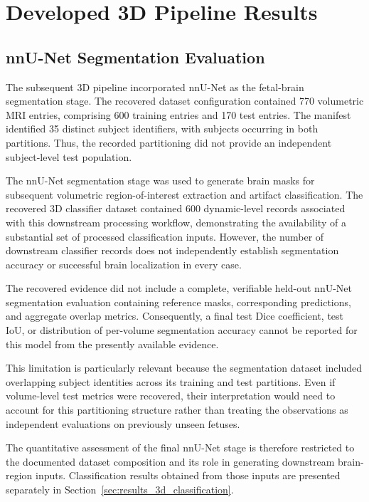 \section{Developed 3D Pipeline Results}
\subsection{nnU-Net Segmentation Evaluation}
\label{subsec:nnunet_segmentation_evaluation}

The subsequent 3D pipeline incorporated nnU-Net as the fetal-brain segmentation stage. The recovered dataset configuration contained 770 volumetric MRI entries, comprising 600 training entries and 170 test entries. The manifest identified 35 distinct subject identifiers, with subjects occurring in both partitions. Thus, the recorded partitioning did not provide an independent subject-level test population.

The nnU-Net segmentation stage was used to generate brain masks for subsequent volumetric region-of-interest extraction and artifact classification. The recovered 3D classifier dataset contained 600 dynamic-level records associated with this downstream processing workflow, demonstrating the availability of a substantial set of processed classification inputs. However, the number of downstream classifier records does not independently establish segmentation accuracy or successful brain localization in every case.

The recovered evidence did not include a complete, verifiable held-out nnU-Net segmentation evaluation containing reference masks, corresponding predictions, and aggregate overlap metrics. Consequently, a final test Dice coefficient, test IoU, or distribution of per-volume segmentation accuracy cannot be reported for this model from the presently available evidence.

This limitation is particularly relevant because the segmentation dataset included overlapping subject identities across its training and test partitions. Even if volume-level test metrics were recovered, their interpretation would need to account for this partitioning structure rather than treating the observations as independent evaluations on previously unseen fetuses.

The quantitative assessment of the final nnU-Net stage is therefore restricted to the documented dataset composition and its role in generating downstream brain-region inputs. Classification results obtained from those inputs are presented separately in Section~\ref{sec:results_3d_classification}.

